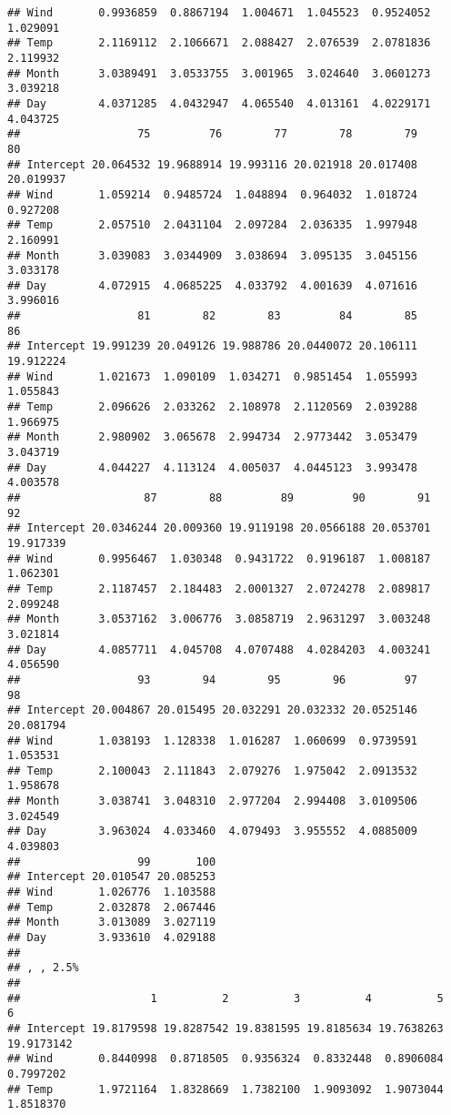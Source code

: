 \documentclass[
]{article}
\begin{document}
\begin{verbatim}
## Wind       0.9936859  0.8867194  1.004671  1.045523  0.9524052  1.029091
## Temp       2.1169112  2.1066671  2.088427  2.076539  2.0781836  2.119932
## Month      3.0389491  3.0533755  3.001965  3.024640  3.0601273  3.039218
## Day        4.0371285  4.0432947  4.065540  4.013161  4.0229171  4.043725
##                  75         76        77        78        79        80
## Intercept 20.064532 19.9688914 19.993116 20.021918 20.017408 20.019937
## Wind       1.059214  0.9485724  1.048894  0.964032  1.018724  0.927208
## Temp       2.057510  2.0431104  2.097284  2.036335  1.997948  2.160991
## Month      3.039083  3.0344909  3.038694  3.095135  3.045156  3.033178
## Day        4.072915  4.0685225  4.033792  4.001639  4.071616  3.996016
##                  81        82        83         84        85        86
## Intercept 19.991239 20.049126 19.988786 20.0440072 20.106111 19.912224
## Wind       1.021673  1.090109  1.034271  0.9851454  1.055993  1.055843
## Temp       2.096626  2.033262  2.108978  2.1120569  2.039288  1.966975
## Month      2.980902  3.065678  2.994734  2.9773442  3.053479  3.043719
## Day        4.044227  4.113124  4.005037  4.0445123  3.993478  4.003578
##                   87        88         89         90        91        92
## Intercept 20.0346244 20.009360 19.9119198 20.0566188 20.053701 19.917339
## Wind       0.9956467  1.030348  0.9431722  0.9196187  1.008187  1.062301
## Temp       2.1187457  2.184483  2.0001327  2.0724278  2.089817  2.099248
## Month      3.0537162  3.006776  3.0858719  2.9631297  3.003248  3.021814
## Day        4.0857711  4.045708  4.0707488  4.0284203  4.003241  4.056590
##                  93        94        95        96         97        98
## Intercept 20.004867 20.015495 20.032291 20.032332 20.0525146 20.081794
## Wind       1.038193  1.128338  1.016287  1.060699  0.9739591  1.053531
## Temp       2.100043  2.111843  2.079276  1.975042  2.0913532  1.958678
## Month      3.038741  3.048310  2.977204  2.994408  3.0109506  3.024549
## Day        3.963024  4.033460  4.079493  3.955552  4.0885009  4.039803
##                  99       100
## Intercept 20.010547 20.085253
## Wind       1.026776  1.103588
## Temp       2.032878  2.067446
## Month      3.013089  3.027119
## Day        3.933610  4.029188
## 
## , , 2.5%
## 
##                    1          2          3          4          5          6
## Intercept 19.8179598 19.8287542 19.8381595 19.8185634 19.7638263 19.9173142
## Wind       0.8440998  0.8718505  0.9356324  0.8332448  0.8906084  0.7997202
## Temp       1.9721164  1.8328669  1.7382100  1.9093092  1.9073044  1.8518370

\end{verbatim}
\end{document}
